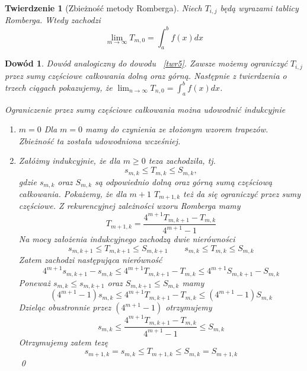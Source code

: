\documentclass{article}
\newtheorem{twr}{Twierdzenie}
\newtheorem*{dd}{Dowód}
\begin{document}
\begin{twr}[Zbieżność metody Romberga]
	Niech $T_{i,j}$ będą wyrazami tablicy Romberga. Wtedy zachodzi
	\begin{equation*}
		\lim_{m \to \infty} T_{m, 0} = \int_a^b f(x) dx
	\end{equation*}
\end{twr}
\begin{dd}
	\normalfont
	Dowód analogiczny do dowodu ~\cref{twr5}. Zawsze możemy ograniczyć $T_{i,j}$ przez sumy częściowe całkowania dolną oraz górną.
	Następnie z twierdzenia o trzech ciągach pokazujemy, że $\lim_{n \to \infty} T_{n,0} = \int_a^b f(x) dx$.

	Ograniczenie przez sumy częściowe całkowania można udowodnić indukcyjnie
	\begin{enumerate}
		\item $m = 0$
			\newline
			Dla $m = 0$ mamy do czynienia ze złożonym wzorem trapezów. Zbieżność ta została udowodniona wcześniej.
		\item Załóżmy indukcyjnie, że dla $m \geq 0$ teza zachodziła, tj.
			\begin{equation*}
				s_{m,k} \leq T_{m,k} \leq S_{m,k} ,
			\end{equation*}
			gdzie $s_{m,k}$ oraz $S_{m,k}$ są odpowiednio dolną oraz górną sumą częściową całkowania.
			Pokażemy, że dla $m + 1$ $T_{m + 1,k}$ też da się ograniczyć przez sumy częściowe.
			Z rekurencyjnej zależności wzoru Romberga mamy
			\begin{equation*}
				T_{m+1,k} = \frac{4^{m + 1} T_{m,k + 1} - T_{m, k}}{4^{m + 1} - 1}
			\end{equation*}
			Na mocy założenia indukcyjnego zachodzą dwie nierówności
			\begin{equation*}
				s_{m,k + 1} \leq T_{m,k + 1} \leq S_{m,k + 1} \quad\quad s_{m,k} \leq T_{m,k} \leq S_{m,k}
			\end{equation*}
			Zatem zachodzi następująca nierówność
			\begin{equation*}
				4^{m+1} s_{m,k+1} - s_{m,k} \leq 4^{m+1} T_{m,k+1} - T_{m,k} \leq 4^{m+1} S_{m,k+1} - S_{m,k}
			\end{equation*}
			Poneważ $s_{m,k} \leq s_{m,k+1}$ oraz $S_{m,k+1} \leq S_{m,k}$ mamy
			\begin{equation*}
				(4^{m+1} - 1) s_{m,k} \leq 4^{m+1} T_{m,k+1} - T_{m,k} \leq (4^{m+1} - 1) S_{m,k}
			\end{equation*}
			Dzieląc obustronnie przez $(4^{m+1} - 1)$ otrzymujemy
			\begin{equation*}
				s_{m,k} \leq \frac{4^{m+1} T_{m,k+1} - T_{m,k}}{4^{m+1} - 1} \leq S_{m,k}
			\end{equation*}
			Otrzymujemy zatem tezę
			\begin{equation*}
				s_{m+1,k} = s_{m,k} \leq T_{m+1,k} \leq S_{m,k} = S_{m+1,k}
			\end{equation*}
			\qed
	\end{enumerate}
\end{dd}
\end{document}
